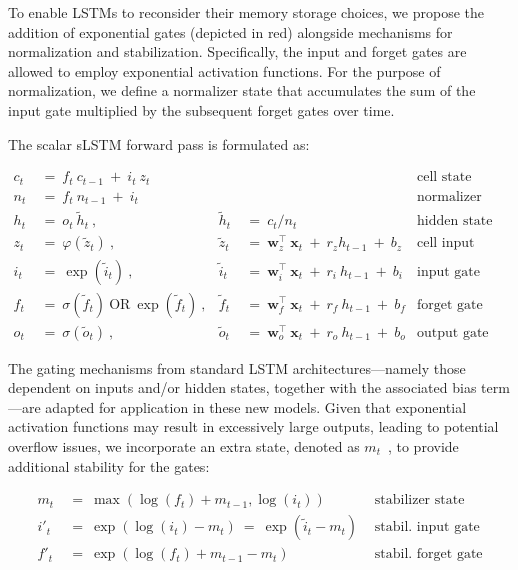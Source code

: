 To enable LSTMs to reconsider their memory storage choices, we propose the addition of exponential gates (depicted in red) alongside mechanisms for normalization and stabilization. Specifically, the input and forget gates are allowed to employ exponential activation functions. For the purpose of normalization, we define a normalizer state that accumulates the sum of the input gate multiplied by the subsequent forget gates over time.

The scalar sLSTM forward pass is formulated as:

\begin{align}
\label{eq:slstmforward}
c_t \ &= \  f_t \ c_{t-1} \ + \ i_t \ z_t & & 
 &\text{cell state} \\
n_t \ &= \  f_t \ n_{t-1} \ + \ i_t  & & 
 &\text{normalizer state} \\
h_t \ &= \ o_t \ \tilde{h}_t \ ,
  &\tilde{h}_t \ &= \ c_t / n_t
&\text{hidden state} \\
z_t \ &= \ \varphi \left( \tilde{z}_t \right) \ , 
  &\tilde{z}_t \ &=  \ \mathbf{w}^\top_{z} \ \mathbf{x}_t \ + \
  r_{z}  h_{t-1} \ + \  b_{z}
  &\text{cell input} \\
i_t \ &= \ \!\exp \left( \tilde{i}_t  \right) \ , 
  &\tilde{i}_t \ &= \ \mathbf{w}^\top_{i} \ \mathbf{x}_t \ + \
  r_{i}  \ h_{t-1} \ + \  b_{i}
  &\text{input gate} \\
f_t \ &= \ \sigma \left(  \tilde{f}_t \right) \ \text{OR} \
\!\exp \left(  \tilde{f}_t \right) \ ,
  &\tilde{f}_t \ &= \ \mathbf{w}^\top_{f} \ \mathbf{x}_t  \ + \
  r_{f}  \ h_{t-1} \ + \  b_{f}
  &\text{forget gate} \\
o_t \ &= \ \sigma \left( \tilde{o}_t \right) \ , 
  &\tilde{o}_t  \ &= \ \mathbf{w}^\top_{o} \ \mathbf{x}_t \ + \
  r_{o}  \ h_{t-1} \ + \  b_{o}
  &\text{output gate} 
\end{align}

The gating mechanisms from standard LSTM architectures—namely those dependent on inputs and/or hidden states, together with the associated bias term—are adapted for application in these new models. Given that exponential activation functions may result in excessively large outputs, leading to potential overflow issues, we incorporate an extra state, denoted as \mbox{$m_t$~\citep{Milakov:18arxiv}}, to provide additional stability for the gates:

\begin{align}
\label{eq:slstmstabil}
m_t \ &= \ \max \left( \log ( f_t ) + m_{t-1} , \log ( i_t ) \right) &\text{stabilizer state} \\
i'_t \ &= \ \!\exp \left( \log \left ( i_t \right) - m_t \right) \ = \ \!\exp \left( \tilde{i}_t - m_t \right) \ \, 
  &\text{stabil. input gate} \\
f'_t \ &= \ \!\exp \left( \log \left( f_t \right) + m_{t-1} - m_t \right) \ \, 
  &\text{stabil. forget gate}
\end{align}

